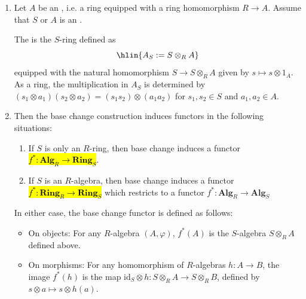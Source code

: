 \begin{definition}
\begin{enumerate}
\begin{itemize}
        \item For right $R$-modules:
        $$f^*: {}_T \mathsf{Mod}_R \to {}_T \mathsf{Mod}_S, \quad M \mapsto M \otimes_R S.$$
        This is the left adjoint to the restriction of scalars functor $f_*: {}_T \mathsf{Mod}_S \to {}_T \mathsf{Mod}_R$.
    \end{itemize}
    
    \item Let $A$ be an , i.e. a ring equipped with a ring homomorphism $R \to A$. Assume that $S$ or $A$ is an .
    
    The  is the $S$-ring defined as
    $$\hlin{ A_S := S \otimes_R A }$$
    equipped with the natural homomorphism $S \to S \otimes_R A$ given by $s \mapsto s \otimes 1_A$. As a ring, the multiplication in $A_S$ is determined by $(s_1 \otimes a_1)(s_2 \otimes a_2) = (s_1 s_2) \otimes (a_1 a_2)$ for $s_1, s_2 \in S$ and $a_1, a_2 \in A$.

        \item 
        Then the base change construction induces functors in the following situations:
        \begin{enumerate}
            \item If $S$ is only an $R$-ring, then base change induces a functor
            \hl{$f^*: \mathbf{Alg}_R \to \mathbf{Ring}_S$}.
            \item If $S$ is an $R$-algebra, then base change induces a functor
            \hl{$f^*: \mathbf{Ring}_R \to \mathbf{Ring}_S$}
            which restricts to a functor $f^*: \mathbf{Alg}_R \to \mathbf{Alg}_S$
        \end{enumerate}
        In either case, the base change functor is defined as follows:
        \begin{itemize}
            \item On objects: For any $R$-algebra $(A, \varphi)$, $f^*(A)$ is the $S$-algebra $S \otimes_R A$ defined above.
            \item On morphisms: For any homomorphism of $R$-algebras $h: A \to B$, the image $f^*(h)$ is the map $\text{id}_S \otimes h: S \otimes_R A \to S \otimes_R B$, defined by $s \otimes a \mapsto s \otimes h(a)$.
        \end{itemize}
\end{enumerate}
\end{definition}